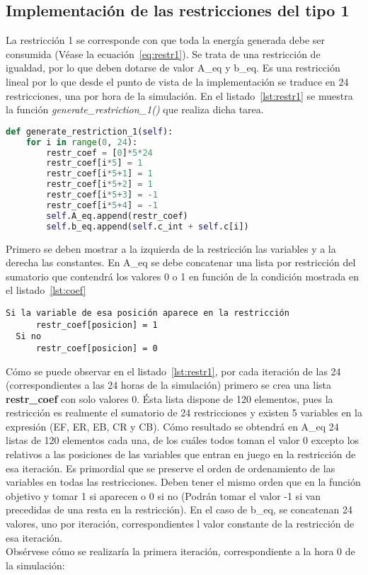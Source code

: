 \subsection{Implementación de las restricciones del tipo 1}
La restricción 1 se corresponde con que toda la energía generada debe ser consumida (Véase la ecuación~\ref{eq:restr1}). Se trata de una restricción de igualdad, por lo que deben dotarse de valor A\_eq y b\_eq. Es una restricción lineal por lo que desde el punto de vista de la implementación se traduce en 24 restricciones, una por hora de la simulación. En el listado~\ref{lst:restr1} se muestra la función \textit{generate\_restriction\_1()} que realiza dicha tarea.\\
\begin{lstlisting}[language=Python,float=ht,caption={Restricciones del tipo 1},label={lst:restr1}]
def generate_restriction_1(self):
    for i in range(0, 24):
        restr_coef = [0]*5*24
        restr_coef[i*5] = 1
        restr_coef[i*5+1] = 1
        restr_coef[i*5+2] = 1
        restr_coef[i*5+3] = -1
        restr_coef[i*5+4] = -1
        self.A_eq.append(restr_coef)
        self.b_eq.append(self.c_int + self.c[i])
\end{lstlisting}

Primero se deben mostrar a la izquierda de la restricción las variables y a la derecha las constantes. En A\_eq se debe concatenar una lista por restricción del sumatorio que contendrá los valores 0 o 1 en función de la condición mostrada en el listado~\ref{lst:coef}
\begin{lstlisting}[numbers=none,float=ht,caption={Condición para dotar de valor los coeficientes},label={lst:coef}]
  Si la variable de esa posición aparece en la restricción
      restr_coef[posicion] = 1
  Si no
      restr_coef[posicion] = 0
\end{lstlisting}
Cómo se puede observar en el listado~\ref{lst:restr1}, por cada iteración de las 24 (correspondientes a las 24 horas de la simulación) primero se crea una lista \textbf{restr\_coef} con solo valores 0. Ésta lista dispone de 120 elementos, pues la restricción es realmente el sumatorio de 24 restricciones y existen 5 variables en la expresión (EF, ER, EB, CR y CB). Cómo resultado se obtendrá en A\_eq 24 listas de 120 elementos cada una, de los cuáles todos toman el valor 0 excepto los relativos a las posiciones de las variables que entran en juego en la restricción de esa iteración. Es primordial que se preserve el orden de ordenamiento de las variables en todas las restricciones. Deben tener el mismo orden que en la función objetivo y tomar 1 si aparecen o 0 si no (Podrán tomar el valor -1 si van precedidas de una resta en la restricción). En el caso de b\_eq, se concatenan 24 valores, uno por iteración, correspondientes l valor constante de la restricción de esa iteración.\\Obsérvese cómo se realizaría la primera iteración, correspondiente a la hora 0 de la simulación:\\

